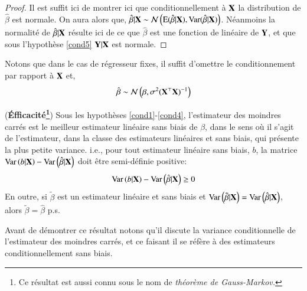 \documentclass[10pt, reqno]{amsart}
\begin{document}
\begin{proof}
Il est suffit ici de montrer ici que conditionnellement à $\mathbf X $ la distribution de $\hat{\beta}$ est normale. On aura alors que, $\hat{\beta} | \mathbf X \sim \mathcal{N}\left(\operatorname{E}(\hat{\beta}| \mathbf X ), \operatorname{Var}(\hat{\beta} | \mathbf X )\right)$. Néanmoins la normalité de $\hat{\beta} | \mathbf X $ résulte ici de ce que $\hat{\beta}$ est une fonction de linéaire de $\mathbf Y$, et que sous l'hypothèse \eqref{cond5} $\mathbf Y|\mathbf X $ est normale.
\end{proof}
Notons que dans le cas de régresseur fixes, il suffit d'omettre le conditionnement par rapport à $\mathbf X $ et,
\begin{align*}
\hat{\beta}\sim\mathcal{N}\left(\beta, \sigma^2(\mathbf X ^\top\mathbf X )^{-1}\right)
\end{align*}
\begin{propriete}(\textbf{\'Efficacité\footnote{Ce résultat est aussi connu sous le nom de \emph{théorème de Gauss-Markov.}}}) Sous les hypothèses \eqref{cond1}-\eqref{cond4}, l'estimateur des moindres carrés est le meilleur estimateur linéaire sans biais de $\beta$, dans le sens où il s'agit de l'estimateur, dans la classe des estimateurs linéaires et sans biais, qui présente la plus petite variance. i.e., pour tout estimateur linéaire sans biais, $b$, la matrice $\operatorname{Var}\left(b|\mathbf X \right)-\operatorname{Var}\left(\hat{\beta}|\mathbf X \right)$ doit être semi-définie positive:
\begin{align*}
\operatorname{Var}\left(b|\mathbf X \right)-\operatorname{Var}\left(\hat{\beta}|\mathbf X \right) \geq 0
\end{align*}
En outre, si $\tilde{\beta}$ est un estimateur linéaire et sans biais et 
$\operatorname{Var}\left(\tilde{\beta}|\mathbf X \right) = \operatorname{Var}\left(\hat{\beta}|\mathbf X \right)$, alors $\tilde{\beta} = \hat{\beta}$ p.s.
\end{propriete}
Avant de démontrer ce résultat notons qu'il discute la variance conditionnelle de l'estimateur des moindres carrés, et ce faisant il se réfère à des estimateurs conditionnellement sans biais.
\end{document}
